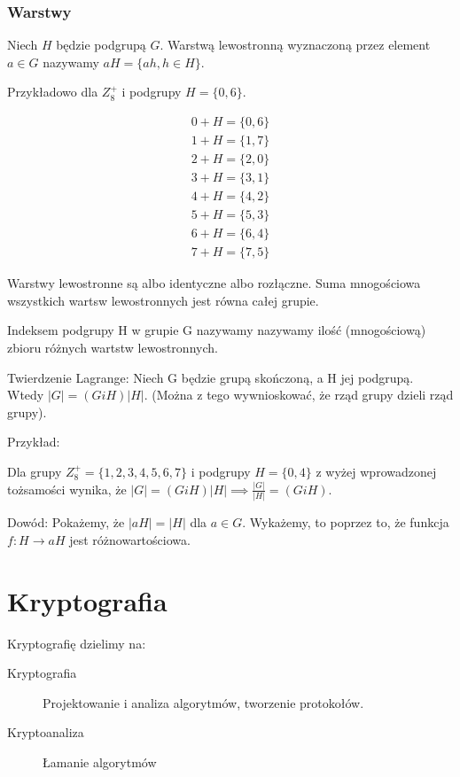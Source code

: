 \documentclass{report}
\begin{document}
\subsection{Warstwy}

Niech $H$ będzie podgrupą $G$. Warstwą lewostronną wyznaczoną przez element $a \in G$ nazywamy $aH = \{ ah, h \in H \}$.

Przykładowo dla $Z_8^+$ i podgrupy $H=\{0,6\}$.

\begin{align*}
0 + H = \{ 0, 6 \} \\
1 + H = \{ 1, 7 \} \\
2 + H = \{ 2, 0 \} \\
3 + H = \{ 3, 1 \} \\
4 + H = \{ 4, 2 \} \\
5 + H = \{ 5, 3 \} \\
6 + H = \{ 6, 4 \} \\
7 + H = \{ 7, 5 \}
\end{align*}

Warstwy lewostronne są albo identyczne albo rozłączne. Suma mnogościowa wszystkich wartsw lewostronnych jest równa całej grupie.

Indeksem podgrupy H w grupie G nazywamy nazywamy ilość (mnogościową) zbioru różnych wartstw lewostronnych.


Twierdzenie Lagrange: Niech G będzie grupą skończoną, a H jej podgrupą. Wtedy $|G| = (GiH)|H|$. (Można z tego wywnioskować, że rząd grupy dzieli rząd grupy).

Przykład:

Dla grupy $Z_8^+ = \{ 1, 2, 3, 4, 5, 6, 7 \}$ i podgrupy $H = \{0,4\}$ z wyżej wprowadzonej tożsamości wynika, że $|G| = (GiH)|H| \implies \frac{|G|}{|H|} = (GiH)$.

Dowód:
Pokażemy, że $|aH| = |H|$ dla $a \in G$.
Wykażemy, to poprzez to, że funkcja $f : H \to aH$ jest różnowartościowa.

\chapter{Kryptografia}

Kryptografię dzielimy na:
\begin{description}
\item[Kryptografia] Projektowanie i analiza algorytmów, tworzenie protokołów.
\item[Kryptoanaliza] Łamanie algorytmów
\end{description}
\end{document}
